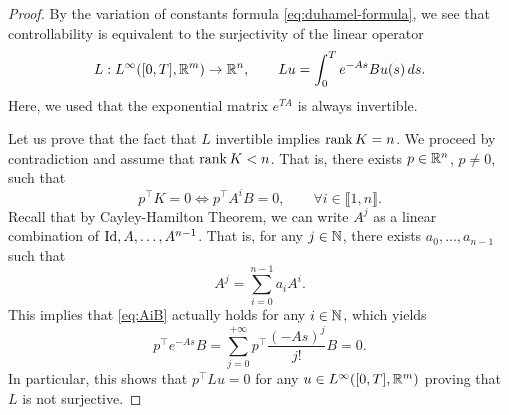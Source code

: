 \begin{proof}
    By the variation of constants formula \eqref{eq:duhamel-formula}, we see that controllability is equivalent to the surjectivity of the linear operator 
    \begin{equation}
        \label{eq:Lu}
        L : L^\infty([0,T],\mathbb{R}^m) \to \mathbb{R}^n, 
        \qquad 
        Lu =\int_0^T e^{-As}Bu(s)\, ds .
    \end{equation}
    Here, we used that the exponential matrix $e^{TA}$ is always invertible.

    Let us prove that the fact that $L$ invertible implies $\operatorname{rank} K=n$. We proceed by contradiction and assume that $\operatorname{rank} K<n$. That is, there exists $p\in \mathbb{R}^n$, $p\neq 0$, such that 
    \begin{equation}
        \label{eq:AiB}
        p^\top K = 0 
        \iff
        p^\top A^i B = 0, \qquad \forall i\in \llbracket 1,n\rrbracket.
    \end{equation}
    Recall that by Cayley-Hamilton Theorem, we can write $A^j$ as a linear combination of $\operatorname{Id}, A,\ldots, A^{n-1}$. That is, for any $j\in\mathbb{N}$, there exists $a_{0},\ldots, a_{n-1}$ such that
    \begin{equation}
        A^j = \sum_{i=0}^{n-1}a_i A^i.
    \end{equation}
    This implies that \eqref{eq:AiB} actually holds for any $i\in \mathbb{N}$, which yields
    \begin{equation}
        p^\top e^{-As}B =  \sum_{j=0}^{+\infty} p^\top \frac{(-As)^j}{j!}B = 0.
    \end{equation}
    In particular, this shows that $p^\top Lu=0$ for any $u\in L^\infty([0,T],\mathbb{R}^m)$ proving that $L$ is not surjective.


\end{proof}
